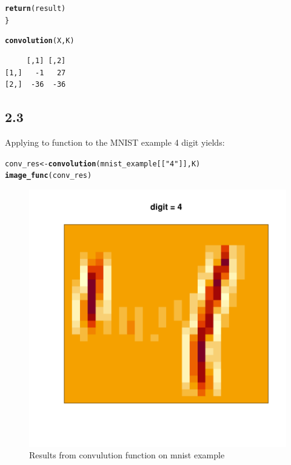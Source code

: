 \documentclass[10pt, a4paper, english]{article}\usepackage[]{graphicx}\usepackage[dvipsnames]{xcolor}
\makeatletter
\def\maxwidth{ %
  \ifdim\Gin@nat@width>\linewidth
    \linewidth
  \else
    \Gin@nat@width
  \fi
}
\newcommand{\hlstr}[1]{\textcolor[rgb]{0.192,0.494,0.8}{#1}}%
\newcommand{\hlstd}[1]{\textcolor[rgb]{0.345,0.345,0.345}{#1}}%
\newcommand{\hlkwb}[1]{\textcolor[rgb]{0.69,0.353,0.396}{#1}}%
\newcommand{\hlkwd}[1]{\textcolor[rgb]{0.737,0.353,0.396}{\textbf{#1}}}%
\newenvironment{kframe}{%
 \def\at@end@of@kframe{}%
 \ifinner\ifhmode%
  \def\at@end@of@kframe{\end{minipage}}%
  \begin{minipage}{\columnwidth}%
 \fi\fi%
 \def\FrameCommand##1{\hskip\@totalleftmargin \hskip-\fboxsep
 \colorbox{shadecolor}{##1}\hskip-\fboxsep
     \hskip-\linewidth \hskip-\@totalleftmargin \hskip\columnwidth}%
 \MakeFramed {\advance\hsize-\width
   \@totalleftmargin\z@ \linewidth\hsize
   \@setminipage}}%
 {\par\unskip\endMakeFramed%
 \at@end@of@kframe}
\newenvironment{knitrout}{}{} %
\makeatother
\begin{document}
\begin{knitrout}
\begin{kframe}
\begin{alltt}
  \hlkwd{return}\hlstd{(result)}
\hlstd{\}}

\hlkwd{convolution}\hlstd{(X,K)}
\end{alltt}
\begin{verbatim}
     [,1] [,2]
[1,]   -1   27
[2,]  -36  -36
\end{verbatim}
\end{kframe}
\end{knitrout}

\subsection{2.3}
Applying to function to the MNIST example 4 digit yields:

\begin{knitrout}
\color{fgcolor}\begin{kframe}
\begin{alltt}
\hlstd{conv_res} \hlkwb{<-} \hlkwd{convolution}\hlstd{(mnist_example[[}\hlstr{"4"}\hlstd{]], K)}
\hlkwd{image_func}\hlstd{(conv_res)}
\end{alltt}
\end{kframe}\begin{figure}
\includegraphics[width=\maxwidth]{figure/unnamed-chunk-35-1} \caption[Results from convulution function on mnist example]{Results from convulution function on mnist example}\label{fig:unnamed-chunk-35}
\end{figure}

\end{knitrout}
\end{document}
